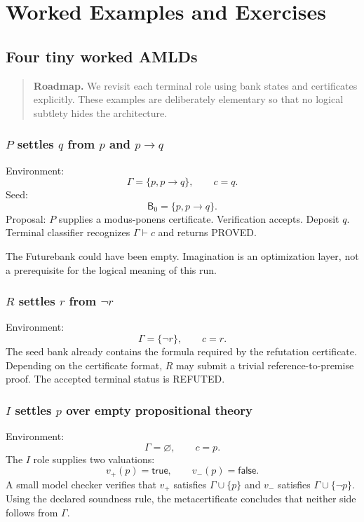 \documentclass[11pt,openany]{book}
\theoremstyle{definition}
\theoremstyle{remark}
\newenvironment{roadmap}{\begin{quote}\small\color{deepblue}\textbf{Roadmap.} }{\end{quote}}
\newcommand{\Bank}{\mathsf{B}}
\begin{document}
\part{Worked Examples and Exercises}

\chapter{Four tiny worked AMLDs}
\begin{roadmap}
We revisit each terminal role using bank states and certificates explicitly. These examples are deliberately elementary so that no logical subtlety hides the architecture.
\end{roadmap}

\section{\texorpdfstring{$P$ settles $q$ from $p$ and $p\to q$}{P settles q from p and p to q}}
Environment:
\[
\Gamma=\{p,p\to q\},\qquad c=q.
\]
Seed:
\[
\Bank_0=\{p,p\to q\}.
\]
Proposal: $P$ supplies a modus-ponens certificate. Verification accepts. Deposit $q$. Terminal classifier recognizes $\Gamma\vdash c$ and returns \textsf{PROVED}.

The Futurebank could have been empty. Imagination is an optimization layer, not a prerequisite for the logical meaning of this run.

\section{\texorpdfstring{$R$ settles $r$ from $\neg r$}{R settles r from not-r}}
Environment:
\[
\Gamma=\{\neg r\},\qquad c=r.
\]
The seed bank already contains the formula required by the refutation certificate. Depending on the certificate format, $R$ may submit a trivial reference-to-premise proof. The accepted terminal status is \textsf{REFUTED}.

\section{\texorpdfstring{$I$ settles $p$ over empty propositional theory}{I settles p over empty propositional theory}}
Environment:
\[
\Gamma=\varnothing,\qquad c=p.
\]
The $I$ role supplies two valuations:
\[
v_+(p)=\textsf{true},\qquad v_-(p)=\textsf{false}.
\]
A small model checker verifies that $v_+$ satisfies $\Gamma\cup\{p\}$ and $v_-$ satisfies $\Gamma\cup\{\neg p\}$. Using the declared soundness rule, the metacertificate concludes that neither side follows from $\Gamma$.
\end{document}

